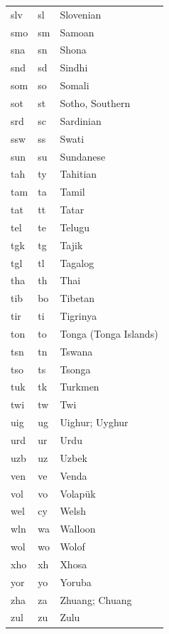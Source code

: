 \documentclass[12pt, twoside]{article}
\begin{document}
\begin{longtable}{|L{3cm}|L{3cm}|L{5cm}|}
slv & sl & Slovenian\\
smo & sm & Samoan\\
sna & sn & Shona\\
snd & sd & Sindhi\\
som & so & Somali\\
sot & st & Sotho, Southern\\
srd & sc & Sardinian\\
ssw & ss & Swati\\
sun & su & Sundanese\\
tah & ty & Tahitian\\
tam & ta & Tamil\\
tat & tt & Tatar\\
tel & te & Telugu\\
tgk & tg & Tajik\\
tgl & tl & Tagalog\\
tha & th & Thai\\
tib & bo & Tibetan\\
tir & ti & Tigrinya\\
ton & to & Tonga (Tonga Islands)\\
tsn & tn & Tswana\\
tso & ts & Tsonga\\
tuk & tk & Turkmen\\
twi & tw & Twi\\
uig & ug & Uighur; Uyghur\\
urd & ur & Urdu\\
uzb & uz & Uzbek\\
ven & ve & Venda\\
vol & vo & Volapük\\
wel & cy & Welsh\\
wln & wa & Walloon\\
wol & wo & Wolof\\
xho & xh & Xhosa\\
yor & yo & Yoruba\\
zha & za & Zhuang; Chuang\\
zul & zu & Zulu\\
\end{longtable}
\FloatBarrier
\clearpage
\end{document}
